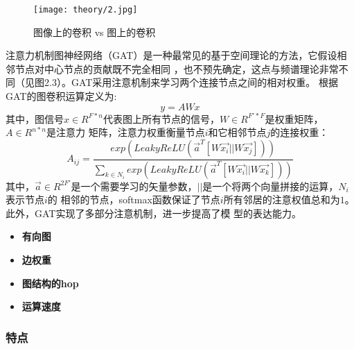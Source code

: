 \begin{figure}[ht]
    \centering
    \texttt{[image: theory/2.jpg]}
    \caption{\label{2-1}图像上的卷积 vs 图上的卷积}
\end{figure}

注意力机制图神经网络（GAT）是一种最常见的基于空间理论的方法，它假设相邻节点对中心节点的贡献既不完全相同
，也不预先确定，这点与频谱理论非常不同（见图2.3）。GAT采用注意机制来学习两个连接节点之间的相对权重。
根据GAT的图卷积运算定义为:
$$  y = A W x $$
其中，图信号$ x\in R^{F*n} $代表图上所有节点的信号，$ W \in R^{F'*F} $是权重矩阵，$A \in R^{n*n}$是注意力
矩阵，注意力权重衡量节点$i$和它相邻节点$j$的连接权重：
$$
    A_{ij} = \frac{exp(LeakyReLU(\vec{a}^{T}[W\vec{x_{i}}||W\vec{x_{j}}]))}
    { {\textstyle \sum_{k\in N_{i} }^{}} exp(LeakyReLU(\vec{a}^{T}[W\vec{x_{i}}||W\vec{x_{k}}]))}  
$$
其中，$\vec{a} \in R^{2F'}$是一个需要学习的矢量参数，$ || $是一个将两个向量拼接的运算，$ N_{i} $表示节点$i$的
相邻的节点，softmax函数保证了节点$i$所有邻居的注意权值总和为$1$。此外，GAT实现了多部分注意机制，进一步提高了模
型的表达能力。

\begin{itemize}
    \item \textbf{有向图} \quad

    
    \item \textbf{边权重} \quad


    \item \textbf{图结构的hop} \quad


    \item \textbf{运算速度} \quad

\end{itemize}

\subsubsection{特点}